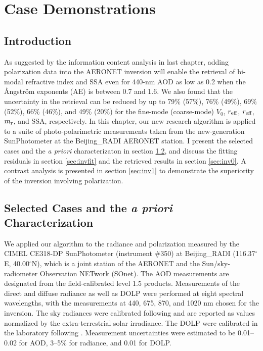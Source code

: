 \chapter{Case Demonstrations} \label{ch:case}

\section{Introduction}

As suggested by the information content analysis in last chapter, 
adding polarization data into the AERONET inversion will enable the 
retrieval of bi-modal refractive index and SSA even for 440-nm AOD as 
low as 0.2 when the Ångström exponents (AE) is between 0.7 and 1.6. 
We also found that the uncertainty in the retrieval can be reduced by up 
to 79\% (57\%), 76\% (49\%), 69\% (52\%), 66\%
(46\%), and 49\% (20\%) for the fine-mode (coarse-mode) $V_0$, $r_\text{eff}$,
$r_\text{eff}$, $m_\text{r}$, and SSA, respectively. 
In this chapter, our new research algorithm is applied to a suite of 
photo-polarimetric measurements taken from the new-generation SunPhotometer 
at the Beijing\_RADI AERONET station. I present the selected cases and the
\textit{a priori} characterizaton in section \ref{sec:case}, and discuss the 
fitting residuals in section \ref{sec:invfit} and the retrieved 
results in section \ref{sec:inv0}. A contrast analysis is presented in section
\ref{sec:inv1} to demonstrate the superiority of the 
inversion involving polarization.

\section{Selected Cases and the \textit{a priori} Characterization}
\label{sec:case}

We applied our algorithm to the radiance and polarization measured by the CIMEL
CE318-DP SunPhotometer (instrument \#350) at Beijing\_RADI (116.37$^\circ$E,
40.00$^\circ$N), which is a joint station of the AERONET and the 
Sun/sky-radiometer Observation NETwork (SOnet). The AOD measurements are 
designated from the field-calibrated level 1.5 products. Measurements of the 
direct and diffuse radiance as well as DOLP were performed at eight spectral 
wavelengths, with the measurements at 440, 675, 870, and 1020 nm chosen for 
the inversion. The sky radiances were calibrated following \citet{Li08} and 
are reported as values normalized by the extra-terrestrial solar irradiance. 
The DOLP were calibrated in the laboratory following \citet{Li10}. 
Measurement uncertainties were estimated to be 0.01--0.02 for AOD, 3--5\% for 
radiance, and 0.01 for DOLP.

